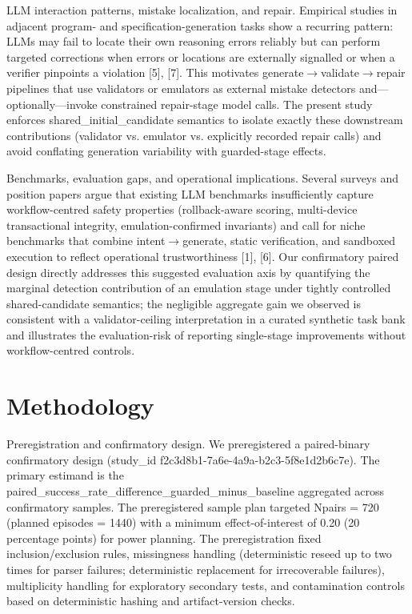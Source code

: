 \documentclass[conference]{IEEEtran}
\begin{document}
LLM interaction patterns, mistake localization, and repair. Empirical studies in adjacent program- and specification-generation tasks show a recurring pattern: LLMs may fail to locate their own reasoning errors reliably but can perform targeted corrections when errors or locations are externally signalled or when a verifier pinpoints a violation [5], [7]. This motivates generate\ensuremath{\rightarrow}validate\ensuremath{\rightarrow}repair pipelines that use validators or emulators as external mistake detectors and---optionally---invoke constrained repair-stage model calls. The present study enforces shared\_initial\_candidate semantics to isolate exactly these downstream contributions (validator vs. emulator vs. explicitly recorded repair calls) and avoid conflating generation variability with guarded-stage effects.

Benchmarks, evaluation gaps, and operational implications. Several surveys and position papers argue that existing LLM benchmarks insufficiently capture workflow-centred safety properties (rollback-aware scoring, multi-device transactional integrity, emulation-confirmed invariants) and call for niche benchmarks that combine intent\ensuremath{\rightarrow}generate, static verification, and sandboxed execution to reflect operational trustworthiness [1], [6]. Our confirmatory paired design directly addresses this suggested evaluation axis by quantifying the marginal detection contribution of an emulation stage under tightly controlled shared-candidate semantics; the negligible aggregate gain we observed is consistent with a validator-ceiling interpretation in a curated synthetic task bank and illustrates the evaluation-risk of reporting single-stage improvements without workflow-centred controls.

\section{Methodology}
Preregistration and confirmatory design. We preregistered a paired-binary confirmatory design (study\_id f2c3d8b1-7a6e-4a9a-b2c3-5f8e1d2b6c7e). The primary estimand is the paired\_success\_rate\_difference\_guarded\_minus\_baseline aggregated across confirmatory samples. The preregistered sample plan targeted Npairs = 720 (planned episodes = 1440) with a minimum effect-of-interest of 0.20 (20 percentage points) for power planning. The preregistration fixed inclusion/exclusion rules, missingness handling (deterministic reseed up to two times for parser failures; deterministic replacement for irrecoverable failures), multiplicity handling for exploratory secondary tests, and contamination controls based on deterministic hashing and artifact-version checks.
\end{document}
